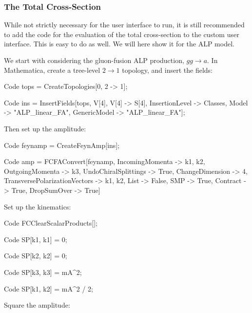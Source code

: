 \documentclass[12pt,a4wide]{article}
\begin{document}
\subsubsection{The Total Cross-Section} \label{sec:alptotxsec} 
While not strictly necessary for the user interface to run, it is still recommended to add the code for the evaluation of the total cross-section to the custom user interface. This is easy to do as well. We will here show it for the ALP model. 

We start with considering the gluon-fusion ALP production, $gg \rightarrow a$. In Mathematica, create a tree-level $2 \rightarrow 1$ topology, and insert the fields: 
\begin{mmaCell}{Code}
tops = CreateTopologies[0, 2 -> 1];
\end{mmaCell}
\begin{mmaCell}{Code}
ins = InsertFields[tops, {V[4], V[4]} -> {S[4]}, InsertionLevel -> {Classes}, Model -> "ALP_linear_FA", GenericModel -> "ALP_linear_FA"];
\end{mmaCell}
Then set up the amplitude: 
\begin{mmaCell}{Code}
feynamp = CreateFeynAmp[ins]; 
\end{mmaCell}
\begin{mmaCell}{Code}
amp = FCFAConvert[feynamp, IncomingMomenta -> {k1, k2}, OutgoingMomenta -> {k3}, UndoChiralSplittings -> True, ChangeDimension -> 4, TransversePolarizationVectors -> {k1, k2}, List -> False, SMP -> True, Contract -> True, DropSumOver -> True] 
\end{mmaCell}
Set up the kinematics: 
\begin{mmaCell}{Code}
FCClearScalarProducts[]; 
\end{mmaCell}
\begin{mmaCell}{Code}
SP[k1, k1] = 0; 
\end{mmaCell}
\begin{mmaCell}{Code}
SP[k2, k2] = 0; 
\end{mmaCell}
\begin{mmaCell}{Code}
SP[k3, k3] = mA^2; 
\end{mmaCell}
\begin{mmaCell}{Code}
SP[k1, k2] = mA^2 / 2; 
\end{mmaCell}
Square the amplitude: 
\end{document}

